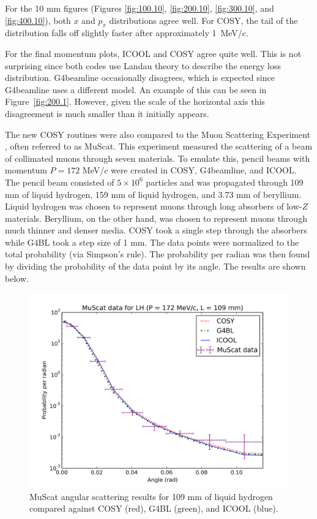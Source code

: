 For the 10 mm figures (Figures \ref{fig:100.10}, \ref{fig:200.10}, \ref{fig:300.10}, and \ref{fig:400.10}), both $x$ and $p_x$ distributions agree well. For COSY, the tail of the distribution falls off slightly faster after approximately 1~MeV/$c$. 

For the final momentum plots, ICOOL and COSY agree quite well. This is not surprising since both codes use Landau theory to describe the energy loss distribution. G4beamline occasionally disagrees, which is expected since G4beamline uses a different model. An example of this can be seen in Figure~\ref{fig:200.1}. However, given the scale of the horizontal axis this disagreement is much smaller than it initially appears.

\label{sec:validation}

The new COSY routines were also compared to the Muon Scattering Experiment \cite{muscat}, often referred to as MuScat. This experiment measured the scattering of a beam of collimated muons through seven materials. To emulate this, pencil beams with momentum $P=172$ MeV/$c$ were created in COSY, G4beamline, and ICOOL. The pencil beam consisted of $5\times10^6$ particles and was propagated through 109 mm of liquid hydrogen, 159 mm of liquid hydrogen, and 3.73 mm of beryllium. Liquid hydrogen was chosen to represent muons through long absorbers of low-$Z$ materials. Beryllium, on the other hand, was chosen to represent muons through much thinner and denser media. COSY took a single step through the absorbers while G4BL took a step size of 1 mm. The data points were normalized to the total probability (via Simpson's rule). The probability per radian was then found by dividing the probability of the data point by its angle. The results are shown below.

\begin{figure}[H]
  \centering
    \includegraphics[width=\textwidth]{Figures/172.109.muscat} 
  \caption{MuScat angular scattering results for 109 mm of liquid hydrogen compared against COSY (red), G4BL (green), and ICOOL (blue).}
  \label{fig:172.109.muscat}
\end{figure}

